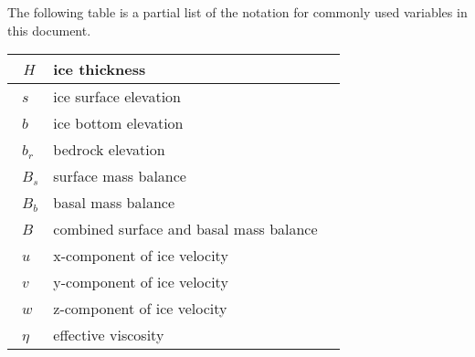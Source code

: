 The following table is a partial list of the notation for commonly used variables in this document.


\begin{center}
  \tablelasttail{\hline}
  \begin{supertabular}{|l|p{8cm}|c|}
    \hline

\ $H$   &    ice thickness  \\
\hline

\ $s$   &    ice surface elevation  \\
\hline

\ $b$   &    ice bottom elevation  \\
\hline

\ $b_r$   &    bedrock elevation  \\
\hline

\ $B_s$   &    surface mass balance  \\
\hline

\ $B_b$   &    basal mass balance  \\
\hline

\ $B$   &    combined surface and basal mass balance  \\
\hline

\ $u$   &    x-component of ice velocity  \\
\hline

\ $v$   &    y-component of ice velocity  \\
\hline

\ $w$   &    z-component of ice velocity  \\
\hline

\ $\eta$   &    effective viscosity  \\
\hline


  \end{supertabular}
\end{center}



